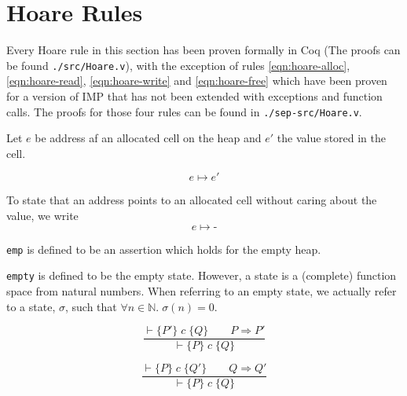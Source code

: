 
\section{Hoare Rules}

Every Hoare rule in this section has been proven formally in Coq (The proofs can be found \verb|./src/Hoare.v|), with the exception of rules \ref{eqn:hoare-alloc}, \ref{eqn:hoare-read}, \ref{eqn:hoare-write} and \ref{eqn:hoare-free} which have been proven for a version of IMP that has not been extended with exceptions and function calls. The proofs for those four rules can be found in \verb|./sep-src/Hoare.v|.

\begin{defn}

Let $e$ be address af an allocated cell on the heap and $e'$ the value stored in the cell.

\begin{equation}
e \mapsto e'
\end{equation}

To state that an address points to an allocated cell without caring about the value, we write
\begin{equation}
e \mapsto \textbf{-}
\end{equation}

\end{defn}

\begin{defn}
\verb|emp| is defined to be an assertion which holds for the empty heap.
\end{defn}

\begin{defn}
\verb|empty| is defined to be the empty state. However, a state is a (complete) function space from natural numbers. When referring to an empty state, we actually refer to a state, $\sigma$, such that $\forall n \in \mathbb{N}.\; \sigma(n) = 0$.
\end{defn}

\begin{equation}\label{eqn:hoare-cons-pre}
\frac{\vdash\{P'\} \; c \; \{Q\} \qquad P \Rightarrow P'}{\vdash\{P\} \; c \; \{Q\}}
\end{equation}

\begin{equation}\label{eqn:hoare-cons-post}
\frac{\vdash\{P\} \; c \; \{Q'\} \qquad Q \Rightarrow Q'}{\vdash\{P\} \; c \; \{Q\}}
\end{equation}

